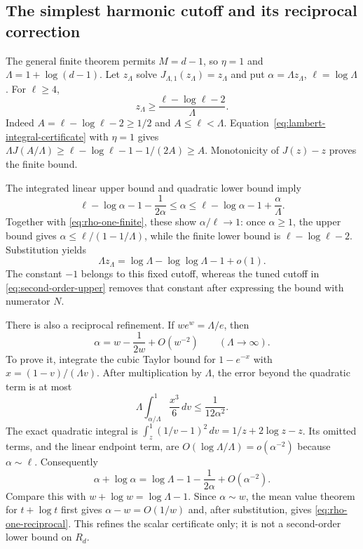 \subsection{The simplest harmonic cutoff and its reciprocal correction}
\label{app:reciprocal-cutoff}
The general finite theorem permits $M=d-1$, so $\eta=1$ and
$\Lambda=1+\log(d-1)$. Let $z_\Lambda$ solve
$J_{\Lambda,1}(z_\Lambda)=z_\Lambda$ and put
$\alpha=\Lambda z_\Lambda$, $\ell=\log\Lambda$. For $\ell\ge4$,
\begin{equation}\label{eq:rho-one-finite}
 z_\Lambda\ge\frac{\ell-\log\ell-2}{\Lambda}.
\end{equation}
Indeed $A=\ell-\log\ell-2\ge1/2$ and $A\le\ell<\Lambda$.
Equation~\eqref{eq:lambert-integral-certificate} with $\eta=1$ gives
$\Lambda J(A/\Lambda)\ge\ell-\log\ell-1-1/(2A)\ge A$.
Monotonicity of $J(z)-z$ proves the finite bound.

The integrated linear upper bound and quadratic lower bound imply
\[
 \ell-\log\alpha-1-\frac1{2\alpha}
 \le\alpha\le\ell-\log\alpha-1+\frac\alpha\Lambda.
\]
Together with \eqref{eq:rho-one-finite}, these show $\alpha/\ell\to1$:
once $\alpha\ge1$, the upper bound gives
$\alpha\le\ell/(1-1/\Lambda)$, while the finite lower bound is
$\ell-\log\ell-2$. Substitution yields
\begin{equation}\label{eq:rho-one-asymptotic}
 \Lambda z_\Lambda=\log\Lambda-\log\log\Lambda-1+o(1).
\end{equation}
The constant $-1$ belongs to this fixed cutoff, whereas the tuned
cutoff in \eqref{eq:second-order-upper} removes that constant after
expressing the bound with numerator $N$.

There is also a reciprocal refinement. If $w e^w=\Lambda/e$, then
\begin{equation}\label{eq:rho-one-reciprocal}
 \alpha=w-\frac1{2w}+O(w^{-2})\qquad(\Lambda\to\infty).
\end{equation}
To prove it, integrate the cubic Taylor bound for $1-e^{-x}$ with
$x=(1-v)/(\Lambda v)$. After multiplication by $\Lambda$, the error
beyond the quadratic term is at most
\[
 \Lambda\int_{\alpha/\Lambda}^1\frac{x^3}{6}\,dv
 \le\frac1{12\alpha^2}.
\]
The exact quadratic integral is
$\int_z^1(1/v-1)^2\,dv=1/z+2\log z-z$.
Its omitted terms, and the linear endpoint term, are
$O(\log\Lambda/\Lambda)=o(\alpha^{-2})$ because $\alpha\sim\ell$.
Consequently
\[
 \alpha+\log\alpha=\log\Lambda-1-\frac1{2\alpha}
                       +O(\alpha^{-2}).
\]
Compare this with $w+\log w=\log\Lambda-1$. Since $\alpha\sim w$,
the mean value theorem for $t+\log t$ first gives
$\alpha-w=O(1/w)$ and, after substitution, gives
\eqref{eq:rho-one-reciprocal}. This refines the scalar certificate only;
it is not a second-order lower bound on $R_d$.

